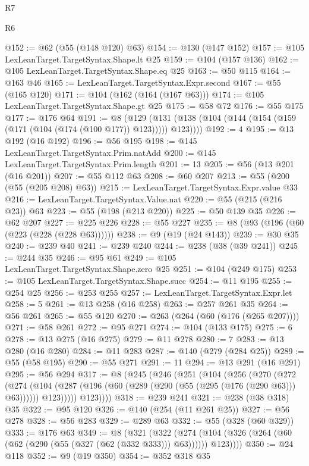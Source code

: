 \begin{lexlean}{R7}
\begin{lexlean}{R6}
\begin{coremodule}
{{{{{{{{{{{{{{{{{{{{@152 := @62 (@55 (@148 @120) @63)
@154 := @130 (@147 @152)
@157 := @105 LexLeanTarget.TargetSyntax.Shape.lt @25
@159 := @104 (@157 @136)
@162 := @105 LexLeanTarget.TargetSyntax.Shape.eq @25
@163 := @50 @115
@164 := @163 @46
@165 := LexLeanTarget.TargetSyntax.Expr.second
@167 := @55 (@165 @120)
@171 := @104 (@162 (@164 (@167 @63)))
@174 := @105 LexLeanTarget.TargetSyntax.Shape.gt @25
@175 := @58 @72
@176 := @55 @175
@177 := @176 @64
@191 := @8
    (@129 (@131 (@138 (@104 (@144 (@154 (@159 (@171 (@104 (@174 (@100 @177)) @123))))) @123))))
@192 := 4
@195 := @13 @192 (@16 @192)
@196 := @56 @195
@198 := @145 LexLeanTarget.TargetSyntax.Prim.natAdd
@200 := @145 LexLeanTarget.TargetSyntax.Prim.length
@201 := 13
@205 := @56 (@13 @201 (@16 @201))
@207 := @55 @112 @63
@208 := @60 @207
@213 := @55 (@200 (@55 (@205 @208) @63))
@215 := LexLeanTarget.TargetSyntax.Expr.value @33
@216 := LexLeanTarget.TargetSyntax.Value.nat
@220 := @55 (@215 (@216 @23)) @63
@223 := @55 (@198 (@213 @220))
@225 := @50 @139 @35
@226 := @62 @207
@227 := @225 @226
@228 := @55 @227
@235 := @8 (@93 (@196 (@60 (@223 (@228 (@228 @63))))))
@238 := @9 (@19 (@24 @143))
@239 := @30 @35
@240 := @239 @40
@241 := @239 @240
@244 := @238 (@38 (@39 @241))
@245 := @244 @35
@246 := @95 @61
@249 := @105 LexLeanTarget.TargetSyntax.Shape.zero @25
@251 := @104 (@249 @175)
@253 := @105 LexLeanTarget.TargetSyntax.Shape.succ
@254 := @11 @195
@255 := @254 @25
@256 := @253 @255
@257 := LexLeanTarget.TargetSyntax.Expr.let
@258 := 5
@261 := @13 @258 (@16 @258)
@263 := @257 @261 @35
@264 := @56 @261
@265 := @55 @120
@270 := @263 (@264 (@60 (@176 (@265 @207))))
@271 := @58 @261
@272 := @95 @271
@274 := @104 (@133 @175)
@275 := 6
@278 := @13 @275 (@16 @275)
@279 := @11 @278
@280 := 7
@283 := @13 @280 (@16 @280)
@284 := @11 @283
@287 := @140 (@279 (@284 @25))
@289 := @55 (@58 @195)
@290 := @55 @271
@291 := 11
@294 := @13 @291 (@16 @291)
@295 := @56 @294
@317 := @8
    (@245
      (@246
        (@251
          (@104
            (@256
              (@270
                (@272
                  (@274
                    (@104
                      (@287 (@196 (@60 (@289 (@290 (@55 (@295 (@176 (@290 @63))) @63))))))
                      @123)))))
            @123))))
@318 := @239 @241
@321 := @238 (@38 @318) @35
@322 := @95 @120
@326 := @140 (@254 (@11 @261 @25))
@327 := @56 @278
@328 := @56 @283
@329 := @289 @63
@332 := @55 (@328 (@60 @329))
@333 := @176 @63
@349 := @8
    (@321
      (@322 (@274 (@104 (@326 (@264 (@60 (@62 (@290 (@55 (@327 (@62 (@332 @333))) @63)))))) @123))))
@350 := @24 @118
@352 := @9 (@19 @350)
@354 := @352 @318 @35
}}}}}}}}}}}}}}}}}}}}
\end{coremodule}
\end{lexlean}
\end{lexlean}

